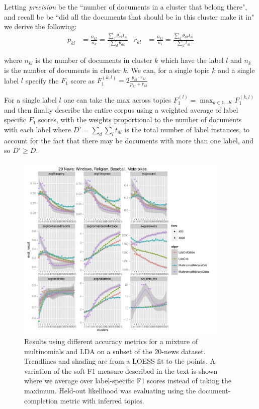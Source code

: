 
Letting \emph{precision} be the ``number of documents in a cluster that belong there", and recall be be ``did all the documents that should be in this cluster make it in" we derive the following:
\begin{align}
p_{kl} & = \frac{n_{kl}}{n_k} = \frac{\sum_d \theta_{dk} t_{dl}}{\sum_d \theta_{dk}}  & r_{kl} & = \frac{n_{kl}}{n_l} = \frac{\sum_d \theta_{dk} t_{dl}}{\sum_d t_{dl}} \label{eqn:myrecall}
\end{align}

where $n_{kl}$ is the number of documents in cluster $k$ which have the label $l$ and $n_k$ is the number of documents in cluster $k$. We can, for a single topic $k$ and a single label $l$ specify the $F_1$ score as $F_1^{(k,l)} = 2 \frac{p_{kl} \cdot {r_{kl}}}{p_{kl} + {r_{kl}}}$

For a single label $l$ one can take the max across topics $F_1^{(l)} = \max_{k \in 1\ldots K} F_1^{(k,l)}$ and then finally describe the entire corpus using a weighted average of label specific $F_1$ scores, with the weights proportional to the number of documents with each label where $D' = \sum_d \sum_l t_{dl}$ is the total number of label instances, to account for the fact that there may be documents with more than one label, and so $D' \geq D$.


\begin{figure}
  \centering
    \includegraphics[width=0.9\textwidth]{../Chap3a/plots/20news-2013-03-25.pdf}
  \caption{Results using different accuracy metrics for a mixture of multinomials and LDA on a subset of the 20-news dataset. Trendlines and shading are from a LOESS fit to the points. A variation of the soft F1 measure described in the text is shown where we average over label-specific F1 scores instead of taking the maximum. Held-out likelihood was evaluating using the document-completion metric with inferred topics.}
  \label{fig:eval-metrics-shootout}
\end{figure}


